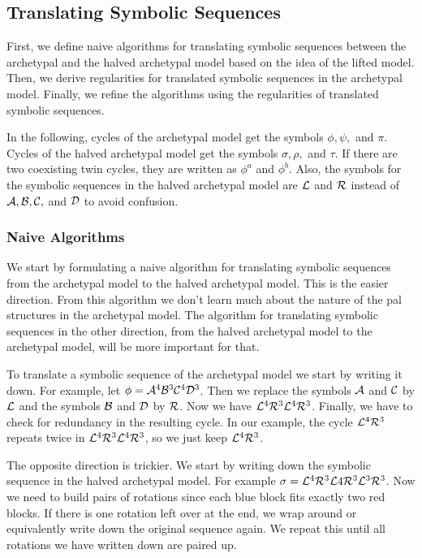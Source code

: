 \subsection{Translating Symbolic Sequences}
\label{sec:add.halved.tanslating}

First, we define naive algorithms for translating symbolic sequences between the archetypal and the halved archetypal model based on the idea of the lifted model.
Then, we derive regularities for translated symbolic sequences in the archetypal model.
Finally, we refine the algorithms using the regularities of translated symbolic sequences.

In the following, cycles of the archetypal model get the symbols $\phi, \psi,$ and $\pi$.
Cycles of the halved archetypal model get the symbols $\sigma, \rho,$ and $\tau$.
If there are two coexisting twin cycles, they are written as $\phi^a$ and $\phi^b$.
Also, the symbols for the symbolic sequences in the halved archetypal model are $\mathcal{L}$ and $\mathcal{R}$ instead of $\mathcal{A}, \mathcal{B}, \mathcal{C},$ and $\mathcal{D}$ to avoid confusion.

\subsubsection{Naive Algorithms}

We start by formulating a naive algorithm for translating symbolic sequences from the archetypal model to the halved archetypal model.
This is the easier direction.
From this algorithm we don't learn much about the nature of the \gls{pal} structures in the archetypal model.
The algorithm for translating symbolic sequences in the other direction, from the halved archetypal model to the archetypal model, will be more important for that.

To translate a symbolic sequence of the archetypal model we start by writing it down.
For example, let $\phi = \mathcal{A}^4\mathcal{B}^3\mathcal{C}^4\mathcal{D}^3$.
Then we replace the symbols $\mathcal{A}$ and $\mathcal{C}$ by $\mathcal{L}$ and the symbols $\mathcal{B}$ and $\mathcal{D}$ by $\mathcal{R}$.
Now we have $\mathcal{L}^4\mathcal{R}^3\mathcal{L}^4\mathcal{R}^3$.
Finally, we have to check for redundancy in the resulting cycle.
In our example, the cycle $\mathcal{L}^4\mathcal{R}^3$ repeats twice in $\mathcal{L}^4\mathcal{R}^3\mathcal{L}^4\mathcal{R}^3$, so we just keep $\mathcal{L}^4\mathcal{R}^3$.

The opposite direction is trickier.
We start by writing down the symbolic sequence in the halved archetypal model.
For example $\sigma = \mathcal{L}^4\mathcal{R}^3\mathcal{L}4\mathcal{R}^3\mathcal{L}^3\mathcal{R}^3$.
Now we need to build pairs of rotations since each blue block fits exactly two red blocks.
If there is one rotation left over at the end, we wrap around or equivalently write down the original sequence again.
We repeat this until all rotations we have written down are paired up.

